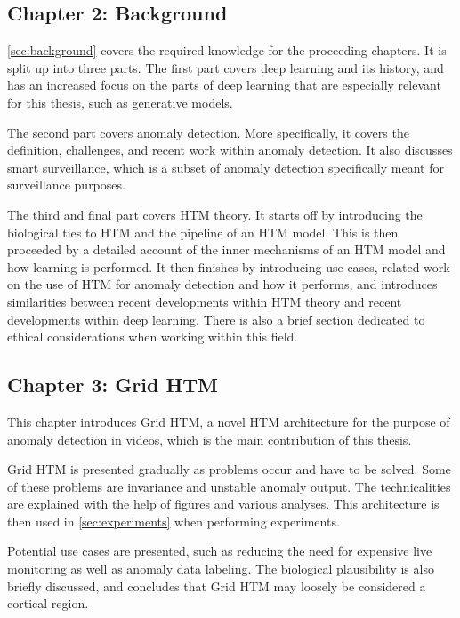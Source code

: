 \subsection*{Chapter 2: Background}
\autoref{sec:background} covers the required knowledge for the proceeding chapters. It is split up into three parts. The first part covers deep learning and its history, and has an increased focus on the parts of deep learning that are especially relevant for this thesis, such as generative models.
\par
The second part covers anomaly detection. More specifically, it covers the definition, challenges, and recent work within anomaly detection. It also discusses smart surveillance, which is a subset of anomaly detection specifically meant for surveillance purposes.
\par
The third and final part covers HTM theory. It starts off by introducing the biological ties to HTM and the pipeline of an HTM model. This is then proceeded by a detailed account of the inner mechanisms of an HTM model and how learning is performed. It then finishes by introducing use-cases, related work on the use of HTM for anomaly detection and how it performs, and introduces similarities between recent developments within HTM theory and recent developments within deep learning. There is also a brief section dedicated to ethical considerations when working within this field.
\subsection*{Chapter 3: Grid HTM}
This chapter introduces Grid HTM, a novel HTM architecture for the purpose of anomaly detection in videos, which is the main contribution of this thesis.
\par
Grid HTM is presented gradually as problems occur and have to be solved. Some of these problems are invariance and unstable anomaly output. The technicalities are explained with the help of figures and various analyses. This architecture is then used in \autoref{sec:experiments} when performing experiments.
\par
Potential use cases are presented, such as reducing the need for expensive live monitoring as well as anomaly data labeling. The biological plausibility is also briefly discussed, and concludes that Grid HTM may loosely be considered a cortical region.
